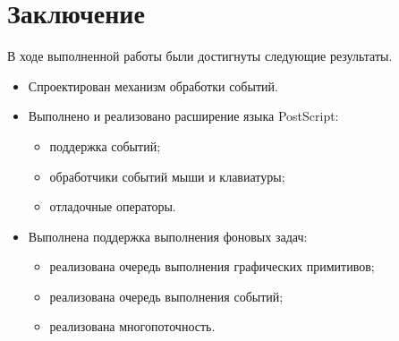 \documentclass[14pt]{matmex-diploma}
\begin{document}
\section*{Заключение}
В ходе выполненной работы были достигнуты следующие результаты.
\begin{itemize}
\item Спроектирован механизм обработки событий.
\item Выполнено и реализовано расширение языка PostScript:
\begin{itemize}
    \item поддержка событий;
    \item обработчики событий мыши и клавиатуры;
    \item отладочные операторы.
\end{itemize}
\item Выполнена поддержка выполнения фоновых задач:
\begin{itemize}
    \item реализована очередь выполнения графических примитивов;
    \item реализована очередь выполнения событий;
    \item реализована многопоточность.
\end{itemize}
\end{itemize}


% 
 
%

\end{document}
